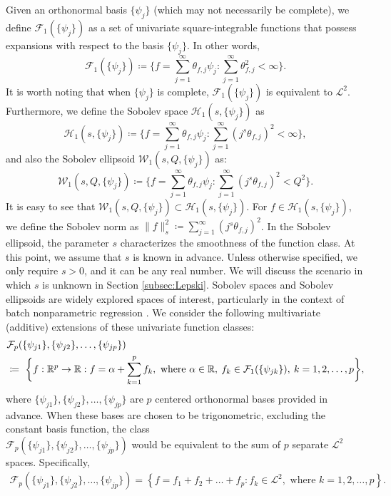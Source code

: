 Given an orthonormal basis $\{\psi_j\}$ (which may not necessarily be complete), we define $\mathcal{F}_1(\{\psi_j\})$ as a set of univariate square-integrable functions that possess expansions with respect to the basis $\{\psi_j\}$. In other words,
$$
\mathcal{F}_1(\{\psi_j\}) \coloneqq \Bigg\{f = \sum_{j=1}^\infty \theta_{f,j}\psi_j : \sum_{j=1}^\infty \theta_{f,j}^2 < \infty\Bigg\}.
$$
It is worth noting that when $\{\psi_j\}$ is complete, $\mathcal{F}_1(\{\psi_j\})$ is equivalent to $\mathcal{L}^2$.  Furthermore, we define the Sobolev space $\mathcal{H}_1(s, \{\psi_j\})$ as
$$
\mathcal{H}_1(s, \{\psi_j\}) \coloneqq \Bigg\{f = \sum_{j=1}^\infty \theta_{f,j}\psi_j : \sum_{j=1}^\infty (j^s\theta_{f,j})^2 < \infty\Bigg\},
$$
and also the Sobolev ellipsoid $\mathcal{W}_1(s,Q,\{\psi_j\})$ as:
$$
\mathcal{W}_1(s,Q, \{\psi_j\}) \coloneqq \Bigg\{f = \sum_{j=1}^\infty \theta_{f,j}\psi_j : \sum_{j=1}^\infty (j^s\theta_{f,j})^2 < Q^2\Bigg\}.
$$
It is easy to see that $\mathcal{W}_1(s,Q, \{\psi_j\}) \subset \mathcal{H}_1(s, \{\psi_j\})$. For $f \in \mathcal{H}_1(s, \{\psi_j\})$, we define the Sobolev norm as  $\|f\|_s^2 \coloneqq \sum_{j=1}^\infty (j^s\theta_{f,j})^2$. In the Sobolev ellipsoid, the parameter $s$ characterizes the smoothness of the function class. At this point, we assume that $s$ is known in advance. Unless otherwise specified, we only require $s > 0$, and it can be any real number. We will discuss the scenario in which $s$ is unknown in Section \ref{subsec:Lepski}. Sobolev spaces and Sobolev ellipsoids are widely explored spaces of interest, particularly in the context of batch nonparametric regression  \citep{gyorfi2002distribution,DBLP:books/daglib/0035708}. 
We consider the following multivariate (additive) extensions of these univariate function classes:
\begin{align*}
    &\mathcal{F}_p(\{\psi_{j1}\},\{\psi_{j2}\},\dots,\{\psi_{jp}\})\\
    &\coloneqq~ \bigg\{f: \mathbb{R}^p \to \mathbb{R} : f = \alpha +\sum_{k=1}^pf_k, \text{ where } \alpha\in \mathbb{R},\: f_k \in \mathcal{F}_1(\{\psi_{jk}\}),\: k=1,2,\dots,p    \bigg\},
\end{align*}
where $\{\psi_{j1}\},\{\psi_{j2}\},\dots,\{\psi_{jp}\}$ are $p$ centered orthonormal bases provided in advance. When these bases are chosen to be trigonometric, excluding the constant basis function, the class \\$\mathcal{F}_p(\{\psi_{j1}\},\{\psi_{j2}\},\dots,\{\psi_{jp}\})$ would be equivalent to the sum of $p$ separate $\mathcal{L}^2$ spaces. Specifically,
\begin{align*}
    \mathcal{F}_p(\{\psi_{j1}\},\{\psi_{j2}\},\dots,\{\psi_{jp}\}) = \left\{f = f_1+f_2+\dots+f_p : f_k \in \mathcal{L}^2, \text{ where } k=1,2,\dots,p  \right\}.
\end{align*}
